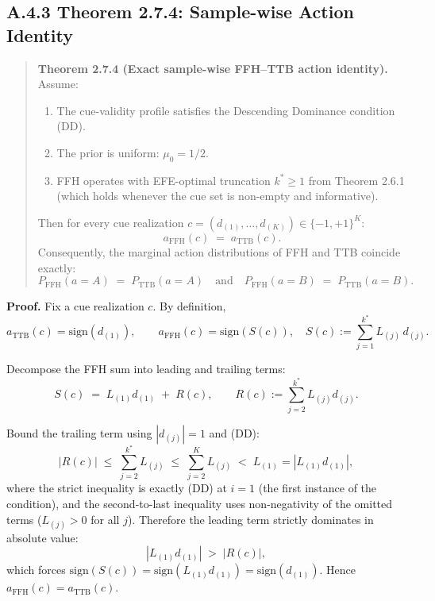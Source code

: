 \documentclass{article}
\providecommand{\tightlist}{\setlength{\itemsep}{0pt}\setlength{\parskip}{0pt}}
\begin{document}
\subsection{A.4.3 Theorem 2.7.4: Sample-wise Action
Identity}\label{a.4.3-theorem-2.7.4-sample-wise-action-identity}

\begin{quote}
\textbf{Theorem 2.7.4 (Exact sample-wise FFH--TTB action identity).}
Assume:

\begin{enumerate}
\def\labelenumi{(\roman{enumi})}
\tightlist
\item
  The cue-validity profile satisfies the Descending Dominance condition
  (DD).
\item
  The prior is uniform: \(\mu_{0} = 1/2\).
\item
  FFH operates with EFE-optimal truncation \(k^{*} \geq 1\) from Theorem
  2.6.1 (which holds whenever the cue set is non-empty and informative).
\end{enumerate}

Then for every cue realization
\(c = (d_{(1)}, \ldots, d_{(K)}) \in \{-1, +1\}^{K}\): \[
a_{\mathrm{FFH}}(c) \;=\; a_{\mathrm{TTB}}(c).
\] Consequently, the marginal action distributions of FFH and TTB
coincide exactly: \[
P_{\mathrm{FFH}}(a = A) \;=\; P_{\mathrm{TTB}}(a = A) \quad\text{and}\quad P_{\mathrm{FFH}}(a = B) \;=\; P_{\mathrm{TTB}}(a = B).
\]
\end{quote}

\textbf{Proof.} Fix a cue realization \(c\). By definition, \[
a_{\mathrm{TTB}}(c) = \mathrm{sign}(d_{(1)}), \qquad a_{\mathrm{FFH}}(c) = \mathrm{sign}\!\left( S(c) \right), \quad S(c) := \sum_{j=1}^{k^{*}} L_{(j)}\, d_{(j)}.
\]

Decompose the FFH sum into leading and trailing terms: \[
S(c) \;=\; L_{(1)} d_{(1)} \;+\; R(c), \qquad R(c) := \sum_{j=2}^{k^{*}} L_{(j)} d_{(j)}.
\]

Bound the trailing term using \(|d_{(j)}| = 1\) and (DD): \[
|R(c)| \;\leq\; \sum_{j=2}^{k^{*}} L_{(j)} \;\leq\; \sum_{j=2}^{K} L_{(j)} \;<\; L_{(1)} = |L_{(1)} d_{(1)}|,
\] where the strict inequality is exactly (DD) at \(i = 1\) (the first
instance of the condition), and the second-to-last inequality uses
non-negativity of the omitted terms (\(L_{(j)} > 0\) for all \(j\)).
Therefore the leading term strictly dominates in absolute value: \[
|L_{(1)} d_{(1)}| \;>\; |R(c)|,
\] which forces
\(\mathrm{sign}(S(c)) = \mathrm{sign}(L_{(1)} d_{(1)}) = \mathrm{sign}(d_{(1)})\).
Hence \(a_{\mathrm{FFH}}(c) = a_{\mathrm{TTB}}(c)\).
\end{document}
